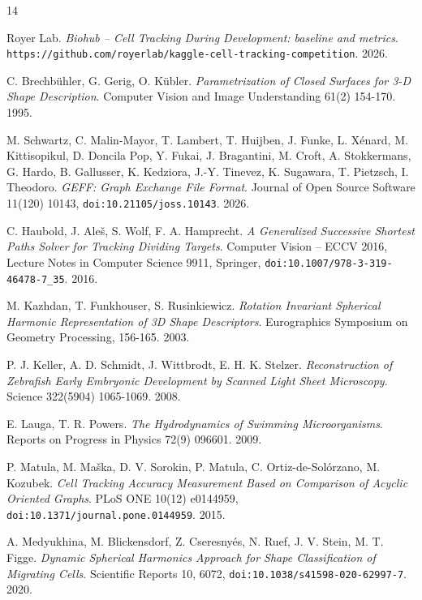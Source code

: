 \backmatter
{}
\begin{thebibliography}{14}

Royer Lab. \emph{Biohub -- Cell Tracking During Development: baseline and metrics}. \texttt{https:/\allowbreak{}/\allowbreak{}github.com/\allowbreak{}royerlab/\allowbreak{}kaggle-cell-tracking-competition}. 2026.

C. Brechb\"uhler, G. Gerig, O. K\"ubler. \emph{Parametrization of Closed Surfaces for 3-D Shape Description}. Computer Vision and Image Understanding 61(2) 154-170. 1995.

M. Schwartz, C. Malin-Mayor, T. Lambert, T. Huijben, J. Funke, L. X\'enard, M. Kittisopikul, D. Doncila Pop, Y. Fukai, J. Bragantini, M. Croft, A. Stokkermans, G. Hardo, B. Gallusser, K. Kedziora, J.-Y. Tinevez, K. Sugawara, T. Pietzsch, I. Theodoro. \emph{GEFF: Graph Exchange File Format}. Journal of Open Source Software 11(120) 10143, \texttt{doi:10.21105/\allowbreak{}joss.10143}. 2026.

C. Haubold, J. Ale\v{s}, S. Wolf, F. A. Hamprecht. \emph{A Generalized Successive Shortest Paths Solver for Tracking Dividing Targets}. Computer Vision -- ECCV 2016, Lecture Notes in Computer Science 9911, Springer, \texttt{doi:10.1007/\allowbreak{}978-3-319-46478-7\_\allowbreak{}35}. 2016.

M. Kazhdan, T. Funkhouser, S. Rusinkiewicz. \emph{Rotation Invariant Spherical Harmonic Representation of 3D Shape Descriptors}. Eurographics Symposium on Geometry Processing, 156-165. 2003.

P. J. Keller, A. D. Schmidt, J. Wittbrodt, E. H. K. Stelzer. \emph{Reconstruction of Zebrafish Early Embryonic Development by Scanned Light Sheet Microscopy}. Science 322(5904) 1065-1069. 2008.

E. Lauga, T. R. Powers. \emph{The Hydrodynamics of Swimming Microorganisms}. Reports on Progress in Physics 72(9) 096601. 2009.

P. Matula, M. Ma\v{s}ka, D. V. Sorokin, P. Matula, C. Ortiz-de-Sol\'orzano, M. Kozubek. \emph{Cell Tracking Accuracy Measurement Based on Comparison of Acyclic Oriented Graphs}. PLoS ONE 10(12) e0144959, \texttt{doi:10.1371/\allowbreak{}journal.pone.0144959}. 2015.

A. Medyukhina, M. Blickensdorf, Z. Cseresny\'es, N. Ruef, J. V. Stein, M. T. Figge. \emph{Dynamic Spherical Harmonics Approach for Shape Classification of Migrating Cells}. Scientific Reports 10, 6072, \texttt{doi:10.1038/\allowbreak{}s41598-020-62997-7}. 2020.


\end{thebibliography}
